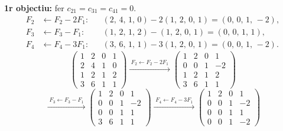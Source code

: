 \documentclass[12pt,a4paper]{article}
\newcommand{\gaussFletxa}[1]{%
  \mathrel{\xrightarrow{\;\scriptstyle #1\;}}%
}
\begin{document}
\textbf{1r objectiu:} fer $c_{21}=c_{31}=c_{41}=0$.
{\setlength{\arraycolsep}{2.2pt}%
\[
  \begin{aligned}
    F_2 &\leftarrow F_2 - 2F_1:
    && (2,\,4,\,1,\,0) - 2(1,\,2,\,0,\,1) = (0,\,0,\,1,\,-2),\\
    F_3 &\leftarrow F_3 - F_1:
    && (1,\,2,\,1,\,2) - (1,\,2,\,0,\,1) = (0,\,0,\,1,\,1),\\
    F_4 &\leftarrow F_4 - 3F_1:
    && (3,\,6,\,1,\,1) - 3(1,\,2,\,0,\,1) = (0,\,0,\,1,\,-2).
  \end{aligned}
\]
\[
  \begin{pmatrix} 1 & 2 & 0 & 1 \\ 2 & 4 & 1 & 0 \\ 1 & 2 & 1 & 2 \\ 3 & 6 & 1 & 1 \end{pmatrix}
  \gaussFletxa{F_2 \leftarrow F_2 - 2F_1}
  \begin{pmatrix} 1 & 2 & 0 & 1 \\ 0 & 0 & 1 & -2 \\ 1 & 2 & 1 & 2 \\ 3 & 6 & 1 & 1 \end{pmatrix}
\]
\[
  \gaussFletxa{F_3 \leftarrow F_3 - F_1}
  \begin{pmatrix} 1 & 2 & 0 & 1 \\ 0 & 0 & 1 & -2 \\ 0 & 0 & 1 & 1 \\ 3 & 6 & 1 & 1 \end{pmatrix}
  \gaussFletxa{F_4 \leftarrow F_4 - 3F_1}
  \begin{pmatrix} 1 & 2 & 0 & 1 \\ 0 & 0 & 1 & -2 \\ 0 & 0 & 1 & 1 \\ 0 & 0 & 1 & -2 \end{pmatrix}
\]
}
\end{document}
